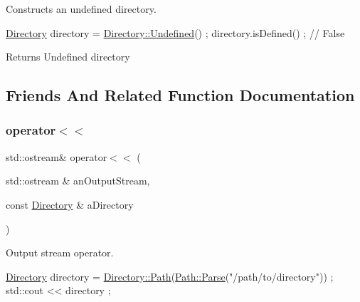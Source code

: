 Constructs an undefined directory. 


\begin{DoxyCode}
\hyperlink{classlibrary_1_1core_1_1fs_1_1_directory_a3ec39f6cad19a81d520e9a1f2d8bb1f7}{Directory} directory = \hyperlink{classlibrary_1_1core_1_1fs_1_1_directory_ae26fce16c37e5fed2bcc4d914a5eaa71}{Directory::Undefined}() ;
directory.isDefined() ; \textcolor{comment}{// False}
\end{DoxyCode}


\begin{DoxyReturn}{Returns}
Undefined directory 
\end{DoxyReturn}


\subsection{Friends And Related Function Documentation}
\mbox{\label{classlibrary_1_1core_1_1fs_1_1_directory_a3cbfede39f82ab145f110ca14e21deef}} 
\subsubsection{\texorpdfstring{operator$<$$<$}{operator<<}}
{\footnotesize\ttfamily std\+::ostream\& operator$<$$<$ (\begin{DoxyParamCaption}\item[{std\+::ostream \&}]{an\+Output\+Stream,  }\item[{const \hyperlink{classlibrary_1_1core_1_1fs_1_1_directory}{Directory} \&}]{a\+Directory }\end{DoxyParamCaption})\hspace{0.3cm}{\ttfamily [friend]}}



Output stream operator. 


\begin{DoxyCode}
\hyperlink{classlibrary_1_1core_1_1fs_1_1_directory_a3ec39f6cad19a81d520e9a1f2d8bb1f7}{Directory} directory = \hyperlink{classlibrary_1_1core_1_1fs_1_1_directory_a6d3ea04654841e62a4dbd99feb563caf}{Directory::Path}(\hyperlink{classlibrary_1_1core_1_1fs_1_1_path_a6ba644b6609507e724c217bf2020f5ae}{Path::Parse}(\textcolor{stringliteral}{"/path/to/directory"}))
       ;
std::cout << directory ;
\end{DoxyCode}



